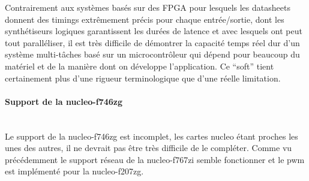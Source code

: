 Contrairement aux systèmes basés sur des FPGA pour lesquels les
datasheets donnent des timings extrêmement précis pour chaque
entrée/sortie, dont les synthétiseurs logiques garantissent les durées
de latence et avec lesquels ont peut tout paralléliser, il est très
difficile de démontrer la capacité temps réel dur d'un système
multi-tâches basé sur un microcontrôleur qui dépend pour beaucoup du
matériel et de la manière dont on développe l'application. Ce 
\enquote{soft} tient certainement plus d'une rigueur terminologique que
d'une réelle limitation.\\

\paragraph{Support de la nucleo-f746zg}~\\

Le support de la nucleo-f746zg est incomplet, les cartes nucleo étant
proches les unes des autres, il ne devrait pas être très difficile de
le compléter. Comme vu précédemment le support réseau de la
nucleo-f767zi semble fonctionner et le pwm est implémenté pour la
nucleo-f207zg.\\

